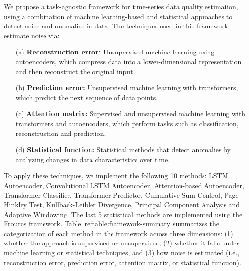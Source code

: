 We propose a task-agnostic framework for time-series data quality estimation, using a combination of machine learning-based and statistical approaches to detect noise and anomalies in data. The techniques used in this framework estimate noise via:

\begin{enumerate}
    \item[(a)] \textbf{Reconstruction error:} Unsupervised machine learning using autoencoders, which compress data into a lower-dimensional representation and then reconstruct the original input.
    \vspace{-0.4cm}
    \item[(b)] \textbf{Prediction error:} Unsupervised machine learning with transformers, which predict the next sequence of data points.
    \vspace{-0.4cm}
    \item[(c)] \textbf{Attention matrix:} Supervised and unsupervised machine learning with transformers and autoencoders, which perform tasks such as classification, reconstruction and prediction.
    \vspace{-0.4cm}
    \item[(d)] \textbf{Statistical function:} Statistical methods that detect anomalies by analyzing changes in data characteristics over time.
\end{enumerate}

To apply these techniques, we implement the following 10 methods: LSTM Autoencoder, Convolutional LSTM Autoencoder, Attention-based Autoencoder, Transformer Classifier, Transformer Predictor, Cumulative Sum Control, Page-Hinkley Test, Kullback-Leibler Divergence, Principal Component Analysis and Adaptive Windowing. The last 5 statistical methods are implemented using the \href{https://github.com/IFCA-Advanced-Computing/frouros}{Frouros} framework. Table~ref{table:framework-summary} summarizes the categorization of each method in the framework across three dimensions: (1) whether the approach is supervised or unsupervised, (2) whether it falls under machine learning or statistical techniques, and (3) how noise is estimated (i.e., reconstruction error, prediction error, attention matrix, or statistical function).

